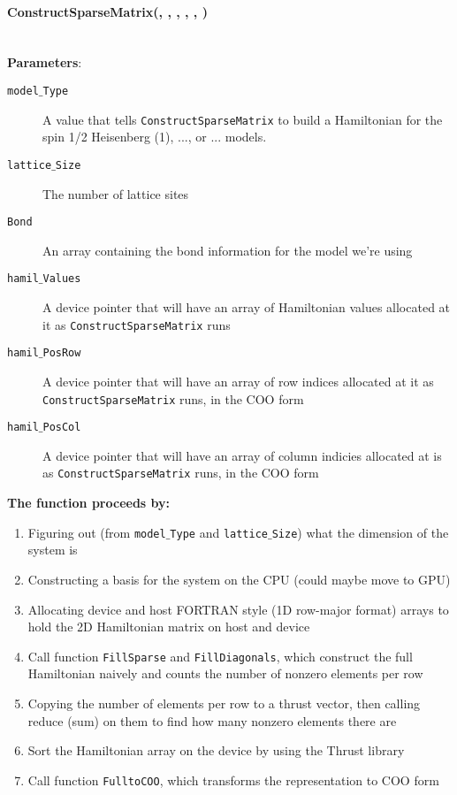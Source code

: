 \documentclass{article}
\begin{document}
\paragraph{\host \int ConstructSparseMatrix(\int, \int, \ptrint, \cuDoubleComplex, \ptrint, \ptrint) \\ \\}
\noindent\textbf{Parameters}:
\begin{description}
\item[\int \texttt{model$\_$Type}] A value that tells \texttt{ConstructSparseMatrix} to build a Hamiltonian for the spin 1/2 Heisenberg (1), ..., or ... models.
\item[\int \texttt{lattice$\_$Size}] The number of lattice sites
\item[\ptrint \texttt{Bond}] An array containing the bond information for the model we're using 
\item[\cuDoubleComplex \texttt{hamil$\_$Values}] A device pointer that will have an array of Hamiltonian values allocated at it as \texttt{ConstructSparseMatrix} runs
\item[\ptrint \texttt{hamil$\_$PosRow}] A device pointer that will have an array of row indices allocated at it as \texttt{ConstructSparseMatrix} runs, in the COO form
\item[\ptrint \texttt{hamil$\_$PosCol}] A device pointer that will have an array of column indicies allocated at is as \texttt{ConstructSparseMatrix} runs, in the COO form
\end{description}

\noindent\textbf{The function proceeds by:}
\begin{enumerate}
\item{Figuring out (from \texttt{model$\_$Type} and \texttt{lattice$\_$Size}) what the dimension of the system is}
\item{Constructing a basis for the system on the CPU (could maybe move to GPU)}
\item{Allocating device and host FORTRAN style (1D row-major format) arrays to hold the 2D Hamiltonian matrix on host and device}
\item{Call function \texttt{FillSparse} and \texttt{FillDiagonals}, which construct the full Hamiltonian naively and counts the number of nonzero elements per row}
\item{Copying the number of elements per row to a thrust vector, then calling reduce (sum) on them to find how many nonzero elements there are}
\item{Sort the Hamiltonian array on the device by using the Thrust library}
\item{Call function \texttt{FulltoCOO}, which transforms the representation to COO form}
\end{enumerate}
\end{document}
